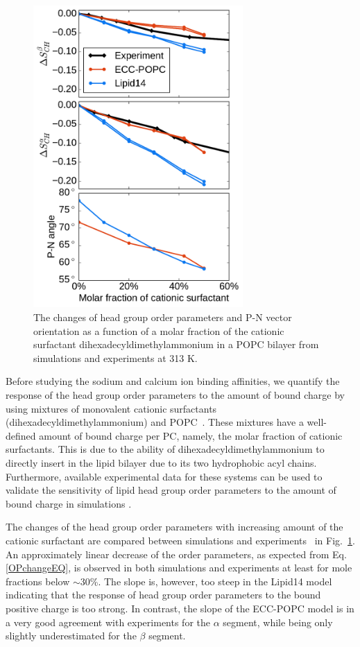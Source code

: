 \begin{figure}[tb!] 
  \centering 
  \includegraphics[width=8.0cm]{../img/ecc_pops/PN_angle_OrdPars-A-B_L14-ECCL17_q80_sig89_surf.pdf} 
  \caption{\label{OrderParameterCHANGESsurf} 
    The changes of head group order parameters and P-N vector orientation as a function of 
    a molar fraction of the cationic surfactant dihexadecyldimethylammonium in a POPC bilayer 
    from simulations and experiments \citep{scherer89} at 313 K.
  } 
\end{figure} 
 
Before studying the sodium and calcium ion binding affinities, we quantify the response of the head group order parameters to the amount of bound charge by using mixtures of monovalent cationic surfactants (dihexadecyldimethylammonium) and POPC~\citep{scherer89}. These mixtures have a well-defined amount of bound charge per PC, namely, the molar fraction of cationic surfactants. This is due to the ability of dihexadecyldimethylammonium to directly insert in the lipid bilayer due to its two hydrophobic acyl chains. Furthermore, available experimental data for these systems can be used to validate the sensitivity of lipid head group order parameters to the amount of bound charge in simulations \citep{scherer89}. 
 
The changes of the head group order parameters with increasing amount of the cationic surfactant are compared between simulations and experiments~\citep{scherer89} in Fig.~\ref{OrderParameterCHANGESsurf}. An approximately linear decrease of the order parameters, as expected from Eq. \ref{OPchangeEQ}, is observed in both simulations and experiments at least for mole fractions below $\sim$30\%. The slope is, however, too steep in the Lipid14 model indicating that the response of head group order parameters to the bound positive charge is too strong. In contrast, the slope of the ECC-POPC model is in a very good agreement with experiments for the $\alpha$ segment, while being only slightly underestimated for the $\beta$ segment. 
 
